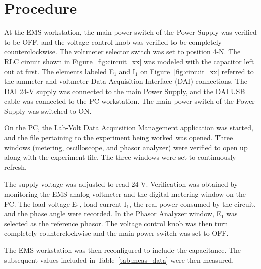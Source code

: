 \documentclass{article}
\begin{document}
\section{Procedure}
At the EMS workstation, the main power switch of the Power Supply was verified
to be OFF, and the voltage control knob was verified to be completely
counterclockwise. The voltmeter selector switch was set to position 4-N. The
RLC circuit shown in Figure~\ref{fig:circuit_xx} was modeled with the capacitor
left out at first. The elements labeled E$_1$ and I$_1$ on
Figure~\ref{fig:circuit_xx} referred to the ammeter and voltmeter Data Acquisition
Interface (DAI) connections. The DAI 24-V supply was connected to the main
Power Supply, and the DAI USB cable was connected to the PC workstation. The
main power switch of the Power Supply was switched to ON.

On the PC, the Lab-Volt Data Acquisition Management application was started,
and the file pertaining to the experiment being worked was opened. Three
windows (metering, oscilloscope, and phasor analyzer) were verified to open up
along with the experiment file. The three windows were set to continuously
refresh.

The supply voltage was adjusted to read 24-V. Verification was obtained by
monitoring the EMS analog voltmeter and the digital metering window on the {PC}.
The load voltage E$_1$, load current I$_1$, the real power consumed by the
circuit, and the phase angle were recorded. In the Phasor Analyzer window,
E$_1$ was selected as the reference phasor. The voltage control knob was then
turn completely counterclockwise and the main power switch was set to OFF.

The EMS workstation was then reconfigured to include the capacitance.  The
subsequent values included in Table~\ref{tab:meas_data} were then measured.
\end{document}

